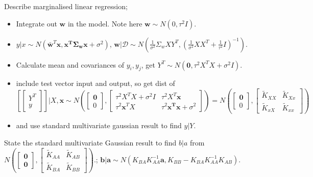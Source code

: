 \documentclass{article}
\begin{document}
Describe marginalised linear regression; \begin{itemize} \item Integrate out $\mathbf{w}$ in the model. Note here $\mathbf{w}\sim N(0, \tau^2I)$. \item $y|x \sim N(\mathbf{\bar{w}}^T\mathbf{x, x^T\Sigma_w x}+\sigma^2)$, $\mathbf{w}|\mathcal{D} \sim N(\frac{1}{\sigma^2}\Sigma_wXY^T, (\frac{1}{\sigma^2}XX^T + \frac{1}{\tau^2}I)^{-1})$.  \item Calculate mean and covariances of $y_i, y_j$, get $Y^T\sim N(\mathbf{0}, \tau^2X^TX+\sigma^2I)$.  \item include test vector input and output, so get dist of $[\begin{bmatrix} Y^T\\ y \end{bmatrix}]|X, \mathbf{x}\sim N(\begin{bmatrix}\mathbf{0} \\ 0 \end{bmatrix}, \begin{bmatrix}\tau^2X^TX +\sigma^2I & \tau^2X^T\mathbf{x} \\ \tau^2\mathbf{x}^TX & \tau^2\mathbf{x^Tx}+\sigma^2 \end{bmatrix})=N(\begin{bmatrix}\mathbf{0} \\ 0 \end{bmatrix}, \begin{bmatrix}\tilde{K}_{XX} & \tilde{K}_{Xx} \\ \tilde{K}_{xX} & \tilde{K}_{xx} \end{bmatrix})$ \item and use standard multivariate gaussian result to find $y|Y$.   \end{itemize}

State the standard multivariate Gaussian result to find $b|a$ from $N(\begin{bmatrix}\mathbf{0} \\ \mathbf{0} \end{bmatrix}, \begin{bmatrix}\tilde{K}_{AA} & \tilde{K}_{AB} \\ \tilde{K}_{BA} & \tilde{K}_{BB} \end{bmatrix})$.; $\mathbf{b|a}\sim N(K_{BA}K_{AA}^{-1}\mathbf{a}, K_{BB}-K_{BA}K_{AA}^{-1}K_{AB})$.
\end{document}
